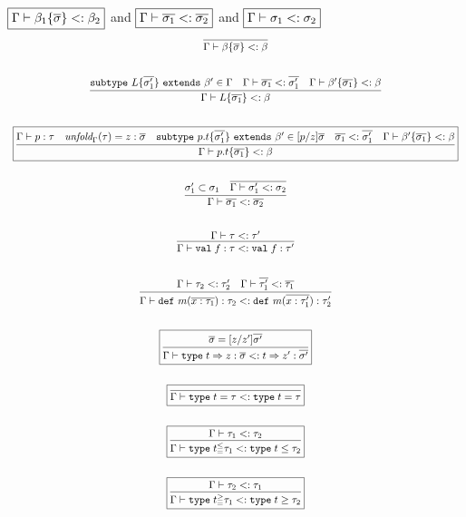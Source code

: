 \documentclass{article}
\newcommand{\keywadj}[1]{\mathtt{#1}}
\newcommand{\keyw}[1]{\keywadj{#1}~}
\begin{document}
$\fbox{$\Gamma \vdash \beta_1\{\overline{\sigma}\} <: \beta_2$}$ and $\fbox{$\Gamma \vdash \overline{\sigma_1} <: \overline{\sigma_2}$}$  and $\fbox{$\Gamma \vdash \sigma_1 <: \sigma_2$}$
\[
\begin{array}{c}

\infer
  {\Gamma \vdash \beta\{\overline{\sigma}\} <: \beta}
  {}\\[5ex]

\infer
  {\Gamma \vdash L \{\overline{\sigma_1}\} <: \beta}
  {\keyw{subtype} L \{\overline{\sigma_1'}\} ~\keyw{extends} \beta' \in \Gamma & \Gamma \vdash \overline{\sigma_1} <: \overline{\sigma_1'} & \Gamma \vdash \beta' \{\overline{\sigma_1}\} <: \beta}\\[5ex]
  
\boxed{\infer
  {\Gamma \vdash p.t\{\overline{\sigma_1}\} <: \beta}
  {\Gamma \vdash p : \tau & \textit{unfold}_\Gamma(\tau) = z:\overline{\sigma} & \keyw{subtype} p.t \{\overline{\sigma'_1}\} ~\keyw{extends} \beta' \in [p/z]\overline{\sigma} & \overline{\sigma_1} <: \overline{\sigma'_1} & \Gamma \vdash \beta' \{\overline{\sigma_1}\} <: \beta}
}\\[5ex]

\infer
  {\Gamma \vdash \overline{\sigma_1} <: \overline{\sigma_2}}
  {\sigma_1' \subset \sigma_1 & \overline{\Gamma \vdash \sigma_1' <: \sigma_2}}\\[5ex]
  
\infer
  {\Gamma \vdash \texttt{val} \; f:\tau <: \texttt{val} \; f:\tau'}
  {\Gamma \vdash \tau <: \tau'}\\[5ex]

\infer
  {\Gamma \vdash \keyw{def} m(\overline{x:\tau_1}) : \tau_2 <: \keyw{def} m(\overline{x:\tau_1'}) : \tau_2'}
  {\Gamma \vdash \tau_2 <: \tau_2' & \Gamma \vdash \overline{\tau_1'} <: \overline{\tau_1}}\\[5ex]
  
\boxed{\infer
  {\Gamma \vdash \texttt{type} \; t \Rightarrow z:\overline{\sigma} <: t \Rightarrow z':\overline{\sigma'}}
  {\overline{\sigma} = [z/z']\overline{\sigma'}}
}\\[5ex]

\boxed{\infer
  {\Gamma \vdash \texttt{type} \; t = \tau <: \texttt{type} \; t = \tau}
  {}
}\\[5ex]
  
\boxed{\infer
	{\Gamma \vdash \texttt{type} \; t^\leq_{=} \tau_1 <: \texttt{type} \; t \leq \tau_2}
	{\Gamma \vdash \tau_1 <: \tau_2}}\\[5ex]
	
\boxed{\infer
	{\Gamma \vdash \texttt{type} \; t^\geq_{=} \tau_1 <: \texttt{type} \; t \geq \tau_2}
	{\Gamma \vdash \tau_2 <: \tau_1}}\\[5ex]

\end{array}
\]
\end{document}
